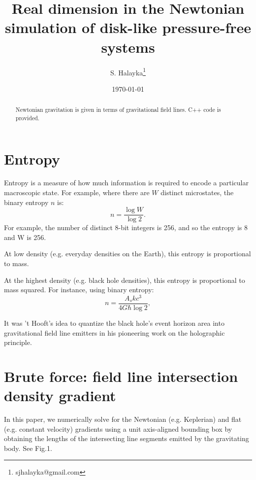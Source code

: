 \documentclass[12pt]{article}
\title{Real dimension in the Newtonian simulation of disk-like pressure-free systems}
\author{S. Halayka\footnote{sjhalayka@gmail.com}}
\date{\today\;\currenttime}
\begin{document}
 
\maketitle

\begin{abstract}
Newtonian gravitation is given in terms of gravitational field lines.
C++ code is provided.
\end{abstract}




\section{Entropy}
Entropy is a measure of how much information is required to encode a particular macroscopic state.
For example, where there are $W$ distinct microstates, the binary entropy $n$ is:
\begin{equation}
n = \frac{\log W}{\log 2}.
\end{equation}
For example, the number of distinct 8-bit integers is 256, and so the entropy is 8 and W is 256.

At low density (e.g. everyday densities on the Earth), this entropy is proportional to mass.

At the highest density (e.g. black hole densities), this entropy is proportional to mass squared.
For instance, using binary entropy:
\begin{equation}
n = \frac{A_s k c^3}{ 4 G \hbar \log 2},
\end{equation}

It was 't Hooft's idea to quantize the black hole's event horizon area into gravitational field line emitters in his pioneering work on the holographic principle.




\section{Brute force: field line intersection density gradient}

In this paper, we numerically solve for the Newtonian (e.g. Keplerian) and flat (e.g. constant velocity) gradients using a unit axis-aligned bounding box by obtaining the lengths of the intersecting line segments emitted by the gravitating body. See Fig.1. 
\end{document}
